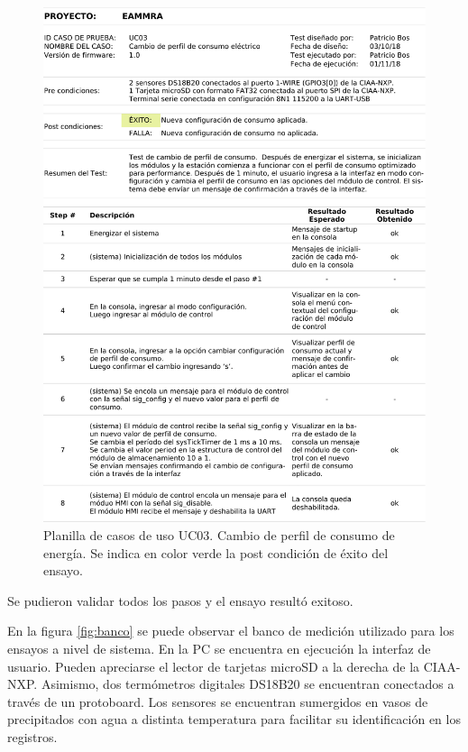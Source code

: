 \vspace{10px}

\begin{figure}[!htb]
	\centering
	\includegraphics[width=1\textwidth]{./Figures/UseCase3.pdf}
	\caption{Planilla de casos de uso UC03.  Cambio de perfil de consumo de energía. Se indica en color verde la post condición de éxito del ensayo.}
	\label{fig:useCase3}
\end{figure}

Se pudieron validar todos los pasos y el ensayo resultó exitoso.

En la figura \ref{fig:banco} se puede observar el banco de medición utilizado para los ensayos a nivel de sistema.  En la PC se encuentra en ejecución la interfaz de usuario.  Pueden apreciarse el lector de tarjetas microSD a la derecha de la CIAA-NXP.  Asimismo, dos termómetros digitales DS18B20 se encuentran conectados a través de un protoboard.  Los sensores se encuentran sumergidos en vasos de precipitados con agua a distinta temperatura para facilitar su identificación en los registros.  

